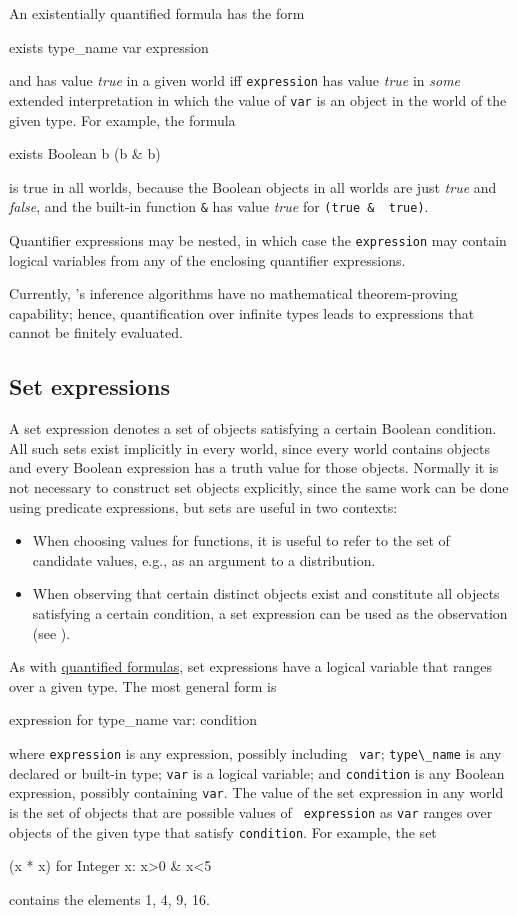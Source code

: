 \documentclass[12pt]{article}
\begin{document}
An existentially quantified formula has the form
\begin{blogcode}
exists type_name var expression
\end{blogcode}
and has value {\it true}
in a given world iff {\tt expression} has value {\it true}
in {\em some} extended interpretation in which the value of {\tt var} 
is an object in the world of the given type. For example, the formula
\begin{blogcode}
exists Boolean b (b & b)
\end{blogcode}
is true in all worlds, because the Boolean objects in all worlds are 
just {\it true} and {\it false}, and the built-in function \verb|&| has value {\it true} for \verb|(true &  true)|.


Quantifier expressions may be nested, in which case
the {\tt expression} may contain logical variables from any of the
enclosing quantifier expressions.

Currently, \bl's inference algorithms have no mathematical
theorem-proving capability; hence, quantification over infinite types
leads to expressions that cannot be finitely evaluated.


\subsection{Set expressions}\label{set-section}
A set expression denotes a set of objects satisfying a certain
Boolean condition. All such sets exist implicitly in every world,
since every world contains objects and every Boolean expression
has a truth value for those objects. Normally it is not necessary to
construct set objects explicitly, since the same work can be done
using predicate expressions, but sets are useful in two contexts:
\begin{itemize}
\item When choosing values for functions, it is useful to refer to the
  set of candidate values, e.g., as an argument to a distribution.
\item When observing that certain distinct objects exist
and constitute all objects satisfying a certain condition,
a set expression can be used as the observation (see ).
\end{itemize}
As with \hyperref[quantifier-section]{quantified formulas}, set
expressions have a logical variable that ranges over a given type.
The most general form is
\begin{blogcode}
{expression for type_name var: condition}
\end{blogcode}
where {\tt expression} is any expression, possibly including {\tt
  var}; \verb|type\_name| is any declared or built-in type; {\tt var} is
a logical variable; and {\tt condition} is any Boolean expression,
possibly containing {\tt var}. The value of the set expression in any
world is the set of objects that are possible values of {\tt
  expression} as {\tt var} ranges over objects of the given type
that satisfy {\tt condition}. For example, the set
\begin{blogcode}
{(x * x) for Integer x: x>0 & x<5}
\end{blogcode}
contains the elements 1, 4, 9, 16.
\end{document}
